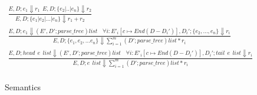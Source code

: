 \begin{figure*}[ht!]
\begin{gather*}
  \frac
  {E,D;e_1 \Downarrow r_1 ~~ E,D;\{e_2|..|e_n\} \Downarrow r_2}
  {E,D;\{e_1|e_2|...|e_n\} \Downarrow r_1+r_2}\\
  \tag{\sc E-Sturct}\label{rule:struct}
  \frac
  {E,D;e_1 \Downarrow (E',D';parse\_tree)list~~~~  \forall i:  E'_i[c \mapsto End(D-D_i')],D_i';\{e_2,...,e_n\} \Downarrow r_i}
  {E,D;\{e_1,e_2,...e_n\} \Downarrow \sum_{i=1}^{m} (D';parse\_tree)list*r_i}\\
  \tag{\sc E-List}\label{rule:list}
  \frac
  {E,D;head ~~e~~list \Downarrow (E',D';parse\_tree)list ~~~~ \forall i:  E'_i[c \mapsto End(D-D_i')],D_i';tail~~e~~list \Downarrow r_i}
  {E,D;e~~list \Downarrow \sum_{i=1}^{m} (D';parse\_tree)list*r_i}\\
\end{gather*}
\caption{Semantics}\label{fig:semantics}
\end{figure*}
